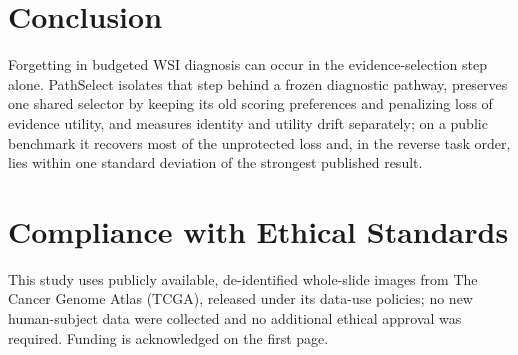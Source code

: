 \documentclass{article}
\begin{document}
\section{Conclusion}

Forgetting in budgeted WSI diagnosis can occur in the evidence-selection step alone. PathSelect isolates that step behind a frozen diagnostic pathway, preserves one shared selector by keeping its old scoring preferences and penalizing loss of evidence utility, and measures identity and utility drift separately; on a public benchmark it recovers most of the unprotected loss and, in the reverse task order, lies within one standard deviation of the strongest published result.




\section*{Compliance with Ethical Standards}
This study uses publicly available, de-identified whole-slide images from The Cancer Genome Atlas (TCGA), released under its data-use policies; no new human-subject data were collected and no additional ethical approval was required. Funding is acknowledged on the first page.
\end{document}
